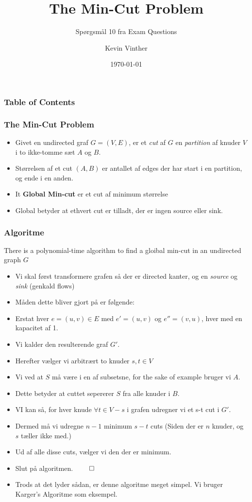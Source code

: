 \documentclass{beamer}
\title{The Min-Cut Problem}
\subtitle{Spørgsmål 10 fra Exam Questions}
\author{Kevin Vinther}
\date{\today}
\begin{document}
\begin{frame}
  \titlepage
\end{frame}

\begin{frame}[allowframebreaks]
  \frametitle{Table of Contents}
  \tableofcontents
\end{frame}

\begin{frame}[allowframebreaks]
  \frametitle{The Min-Cut Problem}
  \begin{itemize}
  \item Givet en undirected graf $G = (V,E)$, er et \textit{cut} af $G$ en \textit{partition} af knuder $V$ i to ikke-tomme sæt $A$ og $B$.
  \item Størrelsen af et cut $(A,B)$ er antallet af edges der har start i en partition, og ende i en anden. 
  \item It \textbf{Global Min-cut} er et cut af minimum størrelse
  \item Global betyder at ethvert cut er tilladt, der er ingen source eller sink. 
  \end{itemize}
\end{frame}

\begin{frame}[allowframebreaks]
  \frametitle{Algoritme}
  \begin{theorem}[13.4]
There is a polynomial-time algorithm to find a gloibal min-cut in an undirected graph $G$
  \end{theorem}
  \begin{itemize}
  \item Vi skal først transformere grafen så der er directed kanter, og en \textit{source} og \textit{sink} (genkald flows)
  \item Måden dette bliver gjort på er følgende:
  \item Erstat hver $e = (u,v) \in E$ med $e' = (u,v)$ og $e'' = (v,u)$, hver med en kapacitet af 1. 
  \item Vi kalder den resulterende graf $G'$.
  \item Herefter vælger vi arbitrært to knuder $s, t \in V$
  \item Vi ved at $S$ må være i en af subsetsne, for the sake of example bruger vi $A$. 
  \item Dette betyder at cuttet sepererer $S$ fra alle knuder i $B$. 
  \item VI kan så, for hver knude $\forall t \in V - {s}$ i grafen udregner vi et s-t cut i $G'$. 
  \item Dermed må vi udregne $n-1$ minimum $s-t$ cuts (Siden der er $n$ knuder, og $s$ tæller ikke med.)
  \item Ud af alle disse cuts, vælger vi den der er minimum.
  \item Slut på algoritmen. $\qed$
  \item Trods at det lyder sådan, er denne algoritme meget simpel. Vi bruger Karger's Algoritme som eksempel.
  \end{itemize}
\end{frame}
\end{document}
